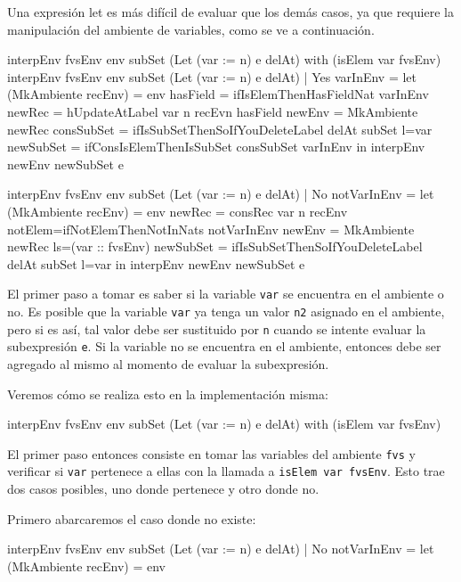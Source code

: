 Una expresión let es más difícil de evaluar que los demás casos, ya que requiere la manipulación del ambiente de variables, como se ve a continuación.

\begin{code}
interpEnv {fvsEnv} env subSet (Let (var := n) e delAt)
    with (isElem var fvsEnv)
  interpEnv {fvsEnv} env subSet (Let (var := n) e delAt)
    | Yes varInEnv =
    let (MkAmbiente recEnv) = env
      hasField = ifIsElemThenHasFieldNat varInEnv 
      newRec = hUpdateAtLabel var n recEvn hasField
      newEnv = MkAmbiente newRec
      consSubSet =
        ifIsSubSetThenSoIfYouDeleteLabel delAt subSet {l=var}
      newSubSet = ifConsIsElemThenIsSubSet consSubSet varInEnv
    in interpEnv newEnv newSubSet e
 
  interpEnv {fvsEnv} env subSet (Let (var := n) e delAt)
    | No notVarInEnv =
    let (MkAmbiente recEnv) = env
      newRec = consRec var n recEnv
        {notElem=ifNotElemThenNotInNats notVarInEnv}
      newEnv = MkAmbiente newRec {ls=(var :: fvsEnv)}
      newSubSet =
        ifIsSubSetThenSoIfYouDeleteLabel delAt subSet {l=var}
    in interpEnv newEnv newSubSet e
\end{code}

El primer paso a tomar es saber si la variable \texttt{var} se encuentra en el ambiente o no. Es posible que la variable \texttt{var} ya tenga un valor \texttt{n2} asignado en el ambiente, pero si es así, tal valor debe ser sustituido por \texttt{n} cuando se intente evaluar la subexpresión \texttt{e}. Si la variable no se encuentra en el ambiente, entonces debe ser agregado al mismo al momento de evaluar la subexpresión.

Veremos cómo se realiza esto en la implementación misma:

\begin{code}
interpEnv {fvsEnv} env subSet (Let (var := n) e delAt)
    with (isElem var fvsEnv)
\end{code}

El primer paso entonces consiste en tomar las variables del ambiente \texttt{fvs} y verificar si \texttt{var} pertenece a ellas con la llamada a \texttt{isElem var fvsEnv}. Esto trae dos casos posibles, uno donde pertenece y otro donde no.

Primero abarcaremos el caso donde no existe:

\begin{code}
interpEnv {fvsEnv} env subSet (Let (var := n) e delAt)
  | No notVarInEnv =
  let (MkAmbiente recEnv) = env
\end{code}

